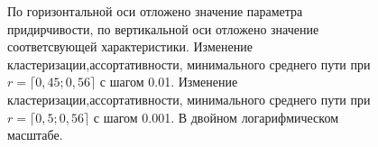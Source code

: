 \documentclass[10pt,aps,pra]{revtex4-1}
\begin{document}
\begin{figure}[H]  

\centering
{}  

\caption{
\label{fig:baCharacteristic}
По горизонтальной оси отложено значение параметра придирчивости, по вертикальной оси отложено значение соответсвующей характеристики.
 Изменение кластеризации,ассортативности, минимального среднего пути при $r=\lceil 0,45; 0,56 \rceil$ с шагом 0.01. 
 Изменение кластеризации,ассортативности, минимального среднего пути при $r=\lceil 0,5; 0,56 \rceil$ с шагом 0.001. В двойном логарифмическом масштабе.
}
\end{figure}



\end{document}
